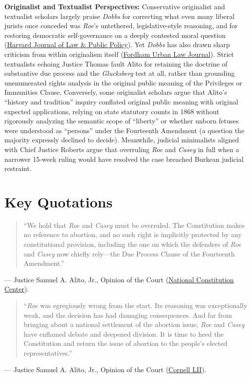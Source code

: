 \documentclass[12pt]{article}
\begin{document}
\textbf{Originalist and Textualist Perspectives:} Conservative originalist and textualist scholars largely praise \textit{Dobbs} for correcting what even many liberal jurists once conceded was \textit{Roe}'s untethered, legislative-style reasoning, and for restoring democratic self-governance on a deeply contested moral question (\href{https://journals.law.harvard.edu/jlpp/wp-content/uploads/sites/90/2023/10/24_46_S_Walsh.pdf}{Harvard Journal of Law \& Public Policy}). Yet \textit{Dobbs} has also drawn sharp criticism from within originalism itself (\href{https://ir.lawnet.fordham.edu/cgi/viewcontent.cgi?article=2923&context=ulj}{Fordham Urban Law Journal}). Strict textualists echoing Justice Thomas fault Alito for retaining the doctrine of substantive due process and the \textit{Glucksberg} test at all, rather than grounding unenumerated rights analysis in the original public meaning of the Privileges or Immunities Clause. Conversely, some originalist scholars argue that Alito's ``history and tradition'' inquiry conflated original public meaning with original expected applications, relying on state statutory counts in 1868 without rigorously analyzing the semantic scope of ``liberty'' or whether unborn fetuses were understood as ``persons'' under the Fourteenth Amendment (a question the majority expressly declined to decide). Meanwhile, judicial minimalists aligned with Chief Justice Roberts argue that overruling \textit{Roe} and \textit{Casey} in full when a narrower 15-week ruling would have resolved the case breached Burkean judicial restraint.

\section{Key Quotations}

\begin{quote}
``We hold that \textit{Roe} and \textit{Casey} must be overruled. The Constitution makes no reference to abortion, and no such right is implicitly protected by any constitutional provision, including the one on which the defenders of \textit{Roe} and \textit{Casey} now chiefly rely---the Due Process Clause of the Fourteenth Amendment.''
\end{quote}
\noindent --- Justice Samuel A. Alito, Jr., Opinion of the Court (\href{https://constitutioncenter.org/the-constitution/supreme-court-case-library/dobbs-v-jackson-womens-health-organization}{National Constitution Center}).

\begin{quote}
``\textit{Roe} was egregiously wrong from the start. Its reasoning was exceptionally weak, and the decision has had damaging consequences. And far from bringing about a national settlement of the abortion issue, \textit{Roe} and \textit{Casey} have enflamed debate and deepened division. It is time to heed the Constitution and return the issue of abortion to the people's elected representatives.''
\end{quote}
\noindent --- Justice Samuel A. Alito, Jr., Opinion of the Court (\href{https://www.law.cornell.edu/supremecourt/text/19-1392}{Cornell LII}).
\end{document}
